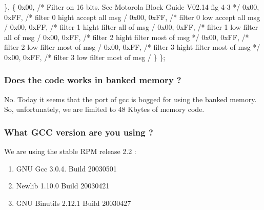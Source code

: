 \documentclass[a4paper,12pt]{book}
\newcommand\liststyleLxiii{%
\renewcommand\labelitemi{{\textbullet}}
\renewcommand\labelitemii{{\textbullet}}
\renewcommand\labelitemiii{{\textbullet}}
\renewcommand\labelitemiv{{\textbullet}}
}
\begin{document}
{  \space \space \space \},\newline
  \space \space \space \{\newline
  \space \space \space \space \space 0x00, \space \space \space /* Filter on 16 bits.\newline
  \space \space \space \space \space \space \space \space \space \space \space \space \space \space \space \space See Motorola Block Guide V02.14 fig
4{}-3 */\newline
  \space \space \space \space \space 0x00, 0xFF, /* filter 0 hight accept all msg
\space \space \space \space \space */\newline
  \space \space \space \space \space 0x00, 0xFF, /* filter 0 low accept all msg
\space \space \space \space \space \space \space */\newline
  \space \space \space \space \space 0x00, 0xFF, /* filter 1 hight filter all of \space msg
\space */\newline
  \space \space \space \space \space 0x00, 0xFF, /* filter 1 low filter all of \space msg
\space \space \space */\newline
  \space \space \space \space \space 0x00, 0xFF, /* filter 2 hight filter most of \space msg
*/\newline
  \space \space \space \space \space 0x00, 0xFF, /* filter 2 low filter most of \space msg
\space \space */\newline
  \space \space \space \space \space 0x00, 0xFF, /* filter 3 hight filter most of \space msg
*/\newline
  \space \space \space \space \space 0x00, 0xFF, /* filter 3 low filter most of \space msg
\space \space */\newline
  \space \space \space \}\newline
  \space \};}

\subsubsection{Does the code works in banked memory ?}
No. Today it seems that the port of gcc is bogged for using the banked
memory. So, unfortunately, we are limited to 48 Kbytes of memory code.

\subsubsection{What GCC version are you using ?}
We are using the stable RPM release 2.2 :

\liststyleLxiii
\begin{enumerate}
\item GNU Gcc 3.0.4. Build 20030501
\item Newlib 1.10.0 Build 20030421
\item GNU Binutils 2.12.1 Build 20030427
\end{enumerate}
\end{document}
